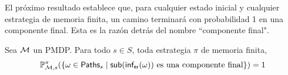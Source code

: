 


El próximo resultado establece que, para cualquier estado inicial y cualquier
estrategia de memoria finita, un camino terminará con probabilidad 1 en una
componente final. Esta es la razón detrás del nombre ``componente final".

\begin{theorem} \label{teoFundEC}
	Sea $\mathcal{M}$ un PMDP. Para todo $s \in S$, toda estrategia $\pi$ de memoria finita,
	$$\mathbb{P}^\pi_{\mathcal{M}, s}(\{ \omega \in \textsf{Paths}_s \mid \textsf{sub}(\textsf{inf}_\textsf{er}(\omega)) \text{ es una componente final}\}) = 1$$
\end{theorem}

